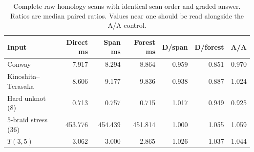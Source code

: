 \begin{table}[htbp]
\centering\small
\setlength{\tabcolsep}{4pt}
\begin{tabular}{@{}lrrrrrr@{}}
\toprule
Input & Direct ms & Span ms & Forest ms & D/span & D/forest & A/A\\\midrule
Conway & 7.917 & 8.294 & 8.864 & 0.959 & 0.851 & 0.970\\
Kinoshita--Terasaka & 8.606 & 9.177 & 9.836 & 0.938 & 0.887 & 1.024\\
Hard unknot (8) & 0.713 & 0.757 & 0.715 & 1.017 & 0.949 & 0.925\\
5-braid stress (36) & 453.776 & 454.439 & 451.814 & 1.000 & 1.055 & 1.059\\
$T(3,5)$ & 3.062 & 3.000 & 2.865 & 1.026 & 1.037 & 1.044\\
\bottomrule
\end{tabular}
\caption{Complete raw homology scans with identical scan order and graded answer. Ratios are median paired ratios. Values near one should be read alongside the A/A control.}
\label{tab:scans}
\end{table}
